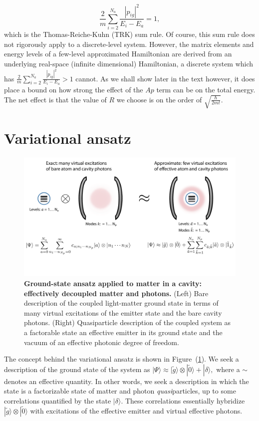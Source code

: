 \documentclass[aps,prb,twocolumn,
	groupedaddress,superscriptaddress,
	amsfonts,amssymb,amsmath,floatfix,
	citeautoscript]{revtex4-1}
\begin{document}
\begin{equation}
\frac{2}{m}\sum\limits_{i=2}^{N_a}\frac{|p_{ig}|^2}{E_i - E_a} = 1,
\end{equation}
which is the Thomas-Reiche-Kuhn (TRK) sum rule. Of course, this sum rule does not rigorously apply to a discrete-level system. However, the matrix elements and energy levels of a few-level approximated Hamiltonian  are derived from an underlying real-space (infinite dimensional) Hamiltonian, a discrete system which has  $\frac{2}{m}\sum\limits_{i=2}^{N_a}\frac{|p_{ig}|^2}{E_i - E_a} > 1$ cannot. As we shall show later in the text however, it does place a bound on how strong the effect of the $Ap$ term can be on the total energy. The net effect is that the value of $R$ we choose is on the order of $\sqrt{\frac{\hbar}{2mt}}$.

\section{Variational ansatz}
\label{sec:variational_ansatz}
\begin{figure}[t]
\includegraphics[width=16cm]{conceptfigure.pdf}
\caption{\textbf{Ground-state ansatz applied to matter in a cavity: effectively decoupled matter and photons.} (Left) Bare description of the coupled light-matter ground state in terms of many virtual excitations of the emitter state and the bare cavity photons. (Right) Quasiparticle description of the coupled system as a factorable state an effective emitter in its ground state and the vacuum of an effective photonic degree of freedom.}
\label{fig:ansatz}
\end{figure}

The concept behind the variational ansatz is shown in Figure~(\ref{fig:ansatz}). We seek a description of the ground state of the system as $|\Psi\rangle \approx |\tilde{g}\rangle\otimes|\tilde{0}\rangle + |\delta\rangle,$ where a $\sim$ denotes an effective quantity. In other words, we seek a description in which the state is a factorizable state of matter and photon \textit{quasi}particles, up to some correlations quantified by the state $|\delta\rangle$. These correlations essentially hybridize $|\tilde{g}\rangle\otimes|\tilde{0}\rangle$ with excitations of the effective emitter and virtual effective photons. 
\end{document}
